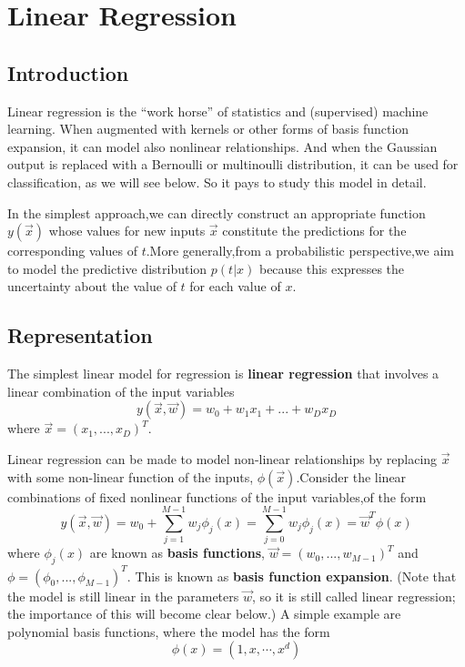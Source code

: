 \chapter{Linear Regression}


\section{Introduction}
Linear regression is the “work horse” of statistics and (supervised) machine learning. When augmented with kernels or other forms of basis function expansion, it can model also nonlinear relationships. And when the Gaussian output is replaced with a Bernoulli or multinoulli distribution, it can be used for classification, as we will see below. So it pays to study this model in detail.

In the simplest approach,we can directly construct an appropriate function $y(\vec{x})$ whose values for new inputs $\vec{x}$ constitute the predictions for the corresponding values of $t$.More generally,from a probabilistic perspective,we aim to model the predictive distribution $p(t|x)$ because this expresses the uncertainty about the value of $t$ for each value of $x$.

\section{Representation}
The simplest linear model for regression is \textbf{linear regression} that involves a linear combination of the input variables
\begin{equation}
y(\vec{x},\vec{w}) = w_0+w_1x_1+...+w_Dx_D
\end{equation}
where $\vec{x}=(x_1,...,x_D)^T$.

Linear regression can be made to model non-linear relationships by replacing $\vec{x}$ with some non-linear function of the inputs, $\phi(\vec{x})$.Consider the linear combinations of fixed nonlinear functions of the input variables,of the form
\begin{equation}
y(\vec{x},\vec{w}) = w_0+\sum_{j=1}^{M-1}w_j\phi_j(x) 
=\sum_{j=0}^{M-1}w_j\phi_j(x) = \vec{w}^T\phi(x)
\end{equation}
where $\phi_j(x)$ are known as \textbf{basis functions},
$\vec{w}=(w_0,...,w_{M-1})^T$ and $\phi=(\phi_0,...,\phi_{M-1})^T$.
This is known as \textbf{basis function expansion}. (Note that the model is still linear in the parameters $\vec{w}$, so it is still called linear regression; the importance of this will become clear below.) A simple example are polynomial basis functions, where the model has the form
\begin{equation}
\phi(x)=(1, x, \cdots, x^d)
\end{equation}


